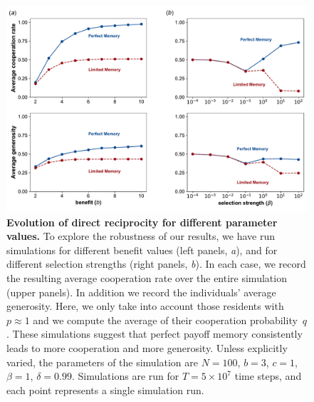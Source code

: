 \documentclass[11pt]{article}
\theoremstyle{plainCl1}
\theoremstyle{plainCl2}
\begin{document}
{\clearpage
\newpage


\begin{figure}[t]
    \centering
    \includegraphics[width=.75\textwidth]{static/cooperation_rate_over_b_and_beta.pdf}
    \caption{{\bf Evolution of direct reciprocity for different parameter values.} 
    To explore the robustness of our results, we have run simulations for different benefit values (left panels, {\it a}), and for different selection strengths (right panels, {\it b}). 
    In each case, we record the resulting average cooperation rate over the entire simulation (upper panels). 
    In addition we record the individuals' average generosity. 
    Here, we only take into account those residents with $p\! \approx\! 1$ and we compute
    the average of their cooperation probability~$q$. 
    These simulations suggest that perfect payoff memory consistently leads to more cooperation and more generosity. 
    Unless explicitly varied, the parameters of the simulation are $N\!=\!100$, $b\!=\!3$, $c\!=\!1$, $\beta\!=\!1$, $\delta\!=\!0.99$.
    Simulations are run for $T\!=\!5\times 10^7$ time steps, and each point represents a single simulation run.}
    \label{fig:cooperation_rate_over_benefit_and_beta}
\end{figure}

\clearpage
\newpage

}
\end{document}
